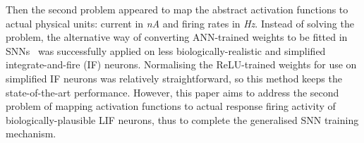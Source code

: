 \documentclass{article}
\begin{document}
Then the second problem appeared to map the abstract activation functions to actual physical units: current in \textit{nA} and firing rates in \textit{Hz}.
Instead of solving the problem, the alternative way of converting ANN-trained weights to be fitted in SNNs~\cite{cao2015spiking,diehl2015fast} was successfully applied 
on less biologically-realistic and simplified integrate-and-fire (IF) neurons.
Normalising the ReLU-trained weights for use on simplified IF neurons was relatively straightforward, so this method keeps the state-of-the-art performance.
However, this paper aims to address the second problem of mapping activation functions to actual response firing activity of biologically-plausible LIF neurons, thus to complete the generalised SNN training mechanism.




\end{document}
